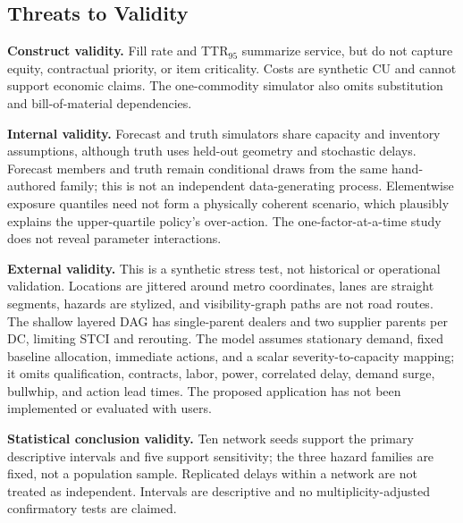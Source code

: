 \documentclass[conference]{IEEEtran}
\begin{document}
\subsection{Threats to Validity}
\textbf{Construct validity.} Fill rate and TTR$_{95}$ summarize service, but
do not capture equity, contractual priority, or item criticality. Costs are
synthetic CU and cannot support economic claims. The one-commodity simulator
also omits substitution and bill-of-material dependencies.

\textbf{Internal validity.} Forecast and truth simulators share capacity and
inventory assumptions, although truth uses held-out geometry and stochastic
delays. Forecast members and truth remain conditional draws from the same
hand-authored family; this is not an independent data-generating process.
Elementwise exposure quantiles need not form a physically coherent scenario,
which plausibly explains the upper-quartile policy's over-action. The
one-factor-at-a-time study does not reveal parameter interactions.

\textbf{External validity.} This is a synthetic stress test, not historical or
operational validation. Locations are jittered around metro coordinates,
lanes are straight segments, hazards are stylized, and visibility-graph paths
are not road routes. The shallow layered DAG has single-parent dealers and two
supplier parents per DC, limiting STCI and rerouting. The model assumes
stationary demand, fixed baseline allocation, immediate actions, and a scalar
severity-to-capacity mapping; it omits qualification, contracts, labor, power,
correlated delay, demand surge, bullwhip, and action lead times. The proposed
application has not been implemented or evaluated with users.

\textbf{Statistical conclusion validity.} Ten network seeds support the
primary descriptive intervals and five support sensitivity; the three hazard
families are fixed, not a population sample. Replicated delays within a
network are not treated as independent. Intervals are descriptive and no
multiplicity-adjusted confirmatory tests are claimed.

\end{document}

